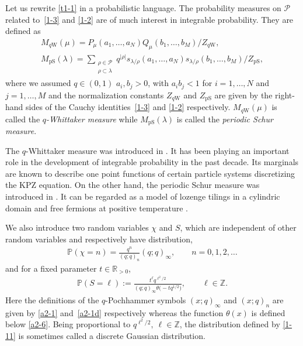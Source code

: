 \documentclass[pdftex]{sigma}
\numberwithin{equation}{section}
\def\i{\infty}
\def\l{\lambda}
\def\P{\mathbb{P}}
\def\Pe{\mathcal{P}}
\begin{document}
 Let us rewrite \eqref{t1-1} in a probabilistic language. The probability measures on $\Pe$ related to~\eqref{1-3} and \eqref{1-2} are of much interest in integrable probability.
 They are defined as
 \begin{gather}
 M_{q\text{W}}(\mu)=P_{\mu}(a_1,\dots,a_N)Q_{\mu}(b_1,\dots,b_M)/Z_{q\text{W}}, \label{s13}
 \\
 M_{\text{pS}}(\l)=
 \sum_{\substack{\rho\in\Pe\\ \rho \subset\l }}q^{|\rho|}s_{\l/\rho}(a_1,\dots,a_N)s_{\l/\rho}(b_1,\dots,b_M)/Z_{\text{pS}}, \label{1-8}
 \end{gather}
 where we assumed $q \in (0,1)$ $a_i,b_j>0$, with $a_ib_j<1$ for $i=1,\dots,N$ and $j=1,\dots,M$ and the normalization constants $Z_{q\text{W}}$ and $Z_{\text{pS}}$ are given by the right-hand sides of the Cauchy identities~\eqref{1-3} and \eqref{1-2} respectively.
 $M_{q\text{W}}(\mu)$ is called the \emph{$q$-Whittaker measure}
 while $M_{\text{pS}}(\l)$ is called the \emph{periodic Schur measure}.

 The $q$-Whittaker measure was introduced in \cite{BorodinCorwin2014Mac}. It has been playing an important role in the development of integrable probability in the past decade. Its marginals are known to describe one point functions of certain particle systems discretizing the KPZ equation. On the other hand, the periodic Schur measure was introduced in \cite{Borodin2007PeriodicSchur}. It can be regarded as a model of lozenge tilings in a cylindric domain and free fermions at positive temperature \cite{BeteaBouttier2019PeriodicSchur}.

 We also introduce two random variables $\chi$ and $S$, which are independent of other random variables and respectively have distribution,
 \begin{align}
\label{t11-3}
\P(\chi=n)=\frac{q^n}{(q;q)_n}(q;q)_{\i},
\qquad
n=0,1,2,\dots
\end{align}
and for a fixed parameter $t \in \mathbb{R}_{>0}$,
 \begin{align}
 \label{1-11}
 \P(S=\ell):=\frac{t^{\ell} q^{\ell^2/2}}{(q;q)_\i
 \theta \bigl(-tq^{1/2}\bigr)},
 \qquad
\ell \in \mathbb{Z}.
\end{align}
Here the definitions of the $q$-Pochhammer symbols
$(x;q)_\i$ and $(x;q)_n$ are given by \eqref{a2-1} and~\eqref{a2-1d} respectively whereas the function $\theta(x)$ is defined below \eqref{a2-6}. Being proportional to $q^{\ell^2/2},~\ell\in\mathbb{Z}$, the distribution defined by \eqref{1-11} is sometimes called a discrete Gaussian distribution.
\end{document}
